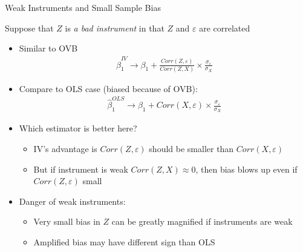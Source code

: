 \documentclass[aspectratio=169,11pt]{beamer}
\begin{document}
\begin{frame}{Weak Instruments and Small Sample Bias}

Suppose that $Z$ is \emph{a bad instrument} in that $Z$ and $\varepsilon$ are correlated

\begin{itemize}
	\item Similar to OVB
		\begin{align*}
			\hat\beta_1^{IV}  \to \beta_1 + \frac{Corr(Z,\varepsilon)}{Corr(Z,X)}\times\frac{\sigma_\varepsilon}{\sigma_X}
		\end{align*}
	\item Compare to OLS case (biased because of OVB):
		\begin{align*}
			\hat\beta_1^{OLS} \to \beta_1 + Corr(X,\varepsilon)\times\frac{\sigma_\varepsilon}{\sigma_X}
		\end{align*}

	\item Which estimator is better here?
		\begin{itemize}
			\item IV's advantage is $Corr(Z,\varepsilon)$ should be smaller than $Corr(X,\varepsilon)$
			\item But if instrument is weak $Corr(Z,X)\approx 0$, then bias blows up even if $Corr(Z,\varepsilon)$ small
		\end{itemize}
\medskip
	\item Danger of weak instruments:
		\begin{itemize}
			\item Very small bias in $Z$ can be greatly magnified if instruments are weak
			\item Amplified bias may have different sign than OLS
		\end{itemize}
\end{itemize}
\end{frame}
\end{document}

